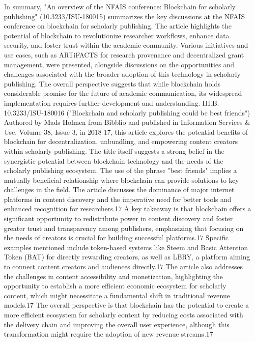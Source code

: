 \documentclass{article}
\begin{document}
In summary, "An overview of the NFAIS conference: Blockchain for scholarly publishing" (10.3233/ISU-180015) summarizes the key discussions at the NFAIS conference on blockchain for scholarly publishing. The article highlights the potential of blockchain to revolutionize researcher workflows, enhance data security, and foster trust within the academic community. Various initiatives and use cases, such as ARTiFACTS for research provenance and decentralized grant management, were presented, alongside discussions on the opportunities and challenges associated with the broader adoption of this technology in scholarly publishing. The overall perspective suggests that while blockchain holds considerable promise for the future of academic communication, its widespread implementation requires further development and understanding.
III.B. 10.3233/ISU-180016 ("Blockchain and scholarly publishing could be best friends")
Authored by Mads Holmen from Bibblio and published in Information Services & Use, Volume 38, Issue 3, in 2018 17, this article explores the potential benefits of blockchain for decentralization, unbundling, and empowering content creators within scholarly publishing. The title itself suggests a strong belief in the synergistic potential between blockchain technology and the needs of the scholarly publishing ecosystem. The use of the phrase "best friends" implies a mutually beneficial relationship where blockchain can provide solutions to key challenges in the field. The article discusses the dominance of major internet platforms in content discovery and the imperative need for better tools and enhanced recognition for researchers.17 A key takeaway is that blockchain offers a significant opportunity to redistribute power in content discovery and foster greater trust and transparency among publishers, emphasizing that focusing on the needs of creators is crucial for building successful platforms.17 Specific examples mentioned include token-based systems like Steem and Basic Attention Token (BAT) for directly rewarding creators, as well as LBRY, a platform aiming to connect content creators and audiences directly.17 The article also addresses the challenges in content accessibility and monetization, highlighting the opportunity to establish a more efficient economic ecosystem for scholarly content, which might necessitate a fundamental shift in traditional revenue models.17 The overall perspective is that blockchain has the potential to create a more efficient ecosystem for scholarly content by reducing costs associated with the delivery chain and improving the overall user experience, although this transformation might require the adoption of new revenue streams.17
\end{document}
